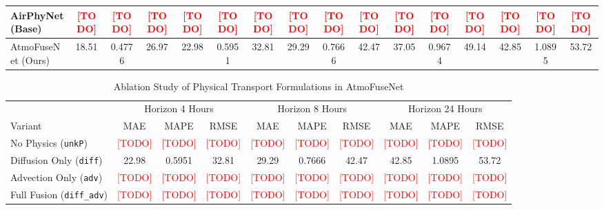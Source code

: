 \documentclass[conference]{IEEEtran}
\begin{document}
\begin{table}[t]
{\begin{tabular}{l|ccc|ccc|ccc|ccc|ccc}
AirPhyNet (Base) \cite{hettige2024airphynet} & \textcolor{red}{[TODO]} & \textcolor{red}{[TODO]} & \textcolor{red}{[TODO]} & \textcolor{red}{[TODO]} & \textcolor{red}{[TODO]} & \textcolor{red}{[TODO]} & \textcolor{red}{[TODO]} & \textcolor{red}{[TODO]} & \textcolor{red}{[TODO]} & \textcolor{red}{[TODO]} & \textcolor{red}{[TODO]} & \textcolor{red}{[TODO]} & \textcolor{red}{[TODO]} & \textcolor{red}{[TODO]} & \textcolor{red}{[TODO]} \\
\midrule
AtmoFuseNet (Ours) & 18.51 & 0.4776 & 26.97 & 22.98 & 0.5951 & 32.81 & 29.29 & 0.7666 & 42.47 & 37.05 & 0.9674 & 49.14 & 42.85 & 1.0895 & 53.72 \\
\bottomrule
\end{tabular}%
}
\end{table}

\begin{table}[t]
\caption{Ablation Study of Physical Transport Formulations in AtmoFuseNet}
\label{tab:ablation}
\centering
\begin{tabular}{l|ccc|ccc|ccc}
\toprule
& \multicolumn{3}{c|}{Horizon 4 Hours} & \multicolumn{3}{c|}{Horizon 8 Hours} & \multicolumn{3}{c}{Horizon 24 Hours} \\
Variant & MAE & MAPE & RMSE & MAE & MAPE & RMSE & MAE & MAPE & RMSE \\
\midrule
No Physics (\texttt{unkP}) & \textcolor{red}{[TODO]} & \textcolor{red}{[TODO]} & \textcolor{red}{[TODO]} & \textcolor{red}{[TODO]} & \textcolor{red}{[TODO]} & \textcolor{red}{[TODO]} & \textcolor{red}{[TODO]} & \textcolor{red}{[TODO]} & \textcolor{red}{[TODO]} \\
Diffusion Only (\texttt{diff}) & 22.98 & 0.5951 & 32.81 & 29.29 & 0.7666 & 42.47 & 42.85 & 1.0895 & 53.72 \\
Advection Only (\texttt{adv}) & \textcolor{red}{[TODO]} & \textcolor{red}{[TODO]} & \textcolor{red}{[TODO]} & \textcolor{red}{[TODO]} & \textcolor{red}{[TODO]} & \textcolor{red}{[TODO]} & \textcolor{red}{[TODO]} & \textcolor{red}{[TODO]} & \textcolor{red}{[TODO]} \\
Full Fusion (\texttt{diff\_adv}) & \textcolor{red}{[TODO]} & \textcolor{red}{[TODO]} & \textcolor{red}{[TODO]} & \textcolor{red}{[TODO]} & \textcolor{red}{[TODO]} & \textcolor{red}{[TODO]} & \textcolor{red}{[TODO]} & \textcolor{red}{[TODO]} & \textcolor{red}{[TODO]} \\
\bottomrule
\end{tabular}
\end{table}
\end{document}
